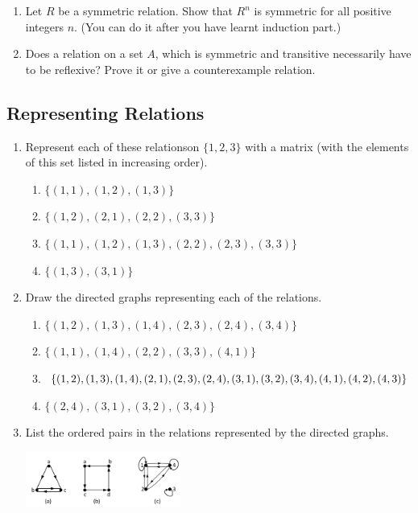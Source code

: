 \documentclass{sig-alternate-05-2015}
\begin{document}
\begin{enumerate}
\item Let $R$ be a symmetric relation. Show that $R^n$ is symmetric for all positive integers $n$. (You can do it after you have learnt induction part.)

\item Does a relation on a set $A$, which is symmetric and transitive necessarily
have to be reflexive? Prove it or give a counterexample relation.
\end{enumerate}

\subsection{Representing Relations}
\begin{enumerate}
\item Represent each of these relationson $\{1, 2, 3\}$ with a matrix (with the elements of this set listed in increasing order).
\begin{enumerate}
	\item $\{(1, 1), (1, 2), (1, 3)\}$ 
	\item $\{(1, 2), (2, 1), (2, 2), (3, 3)\}$
	\item $\{(1, 1), (1, 2), (1, 3), (2, 2), (2, 3), (3, 3)\}$ 
	\item $\{(1, 3), (3, 1)\}$
\end{enumerate}

\item Draw the directed graphs representing each of the relations.
\begin{enumerate}
	\item $\{(1, 2), (1, 3), (1, 4), (2, 3), (2, 4), (3, 4)\}$
	\item $\{(1, 1), (1, 4), (2, 2), (3, 3), (4, 1)\}$
	\item $\{(1, 2), (1, 3), (1, 4), (2, 1), (2, 3), (2, 4),\\ (3, 1), (3, 2),
		(3, 4), (4, 1), (4, 2), (4, 3)\}$
	\item $\{(2, 4), (3, 1), (3, 2), (3, 4)\}$
\end{enumerate}

\item List the ordered pairs in the relations represented by the directed graphs.

	\includegraphics[width=0.4\textwidth]{figs/123.pdf}
\end{enumerate}
\end{document}
